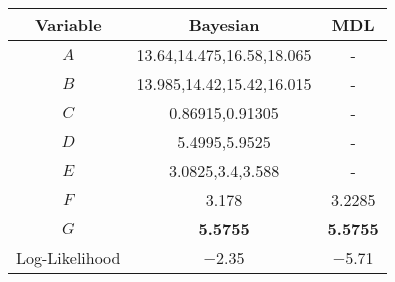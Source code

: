 \scriptsize
{}
\begin{tabular}{@{}ccc@{}}
\toprule
Variable & Bayesian            & MDL          \\
\midrule
$A$    & \num{13.64},\num{14.475},\num{16.58},\num{18.065}   & - \\
$B$    & \num{13.985},\num{14.42},\num{15.42},\num{16.015}   & - \\
$C$    & \num{0.86915},\num{0.91305}               & -            \\
$D$    & \num{5.4995},\num{5.9525}   & -       \\
$E$    & \num{3.0825},\num{3.4},\num{3.588}      & -            \\
$F$    & \num{3.178}            & \num{3.2285}          \\
$G$    & \textbf{\num{5.5755}} & \textbf{\num{5.5755}}            \\
\midrule
Log-Likelihood   & \num{-2.35} & \num{-5.71}        \\
\bottomrule
\end{tabular}